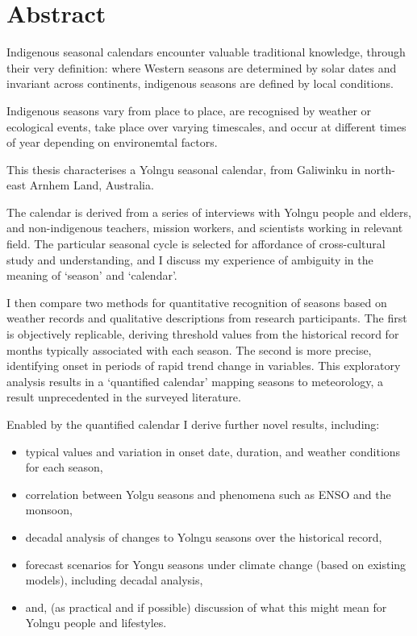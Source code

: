 \chapter{Abstract}

Indigenous seasonal calendars encounter valuable traditional knowledge, through their very definition:
where Western seasons are determined by solar dates and invariant across continents,
indigenous seasons are defined by local conditions.

Indigenous seasons vary from place to place, are recognised by weather or ecological events,
take place over varying timescales, and occur at different times of year depending on environemtal factors.

This thesis characterises a Yolngu seasonal calendar, from Galiwinku in north-east Arnhem Land, Australia.

The calendar is derived from a series of interviews with Yolngu people and elders, and
non-indigenous teachers, mission workers, and scientists working in relevant field.
The particular seasonal cycle is selected for affordance of cross-cultural study and understanding,
and I discuss my experience of ambiguity in the meaning of `season' and `calendar'.

I then compare two methods for quantitative recognition of seasons based on weather records
and qualitative descriptions from research participants.  The first is objectively replicable,
deriving threshold values from the historical record for months typically associated with each season.
The second is more precise, identifying onset in periods of rapid trend change in variables.
This exploratory analysis results in a `quantified calendar' mapping seasons to meteorology,
a result unprecedented in the surveyed literature.

Enabled by the quantified calendar I derive further novel results, including:
\begin{itemize}
\item typical values and variation in onset date, duration, and weather conditions for each season,
\item correlation between Yolgu seasons and phenomena such as ENSO and the monsoon,
\item decadal analysis of changes to Yolngu seasons over the historical record,
\item forecast scenarios for Yongu seasons under climate change (based on existing models), including decadal analysis,
\item and, (as practical and if possible) discussion of what this might mean for Yolngu people and lifestyles.
\end{itemize}


